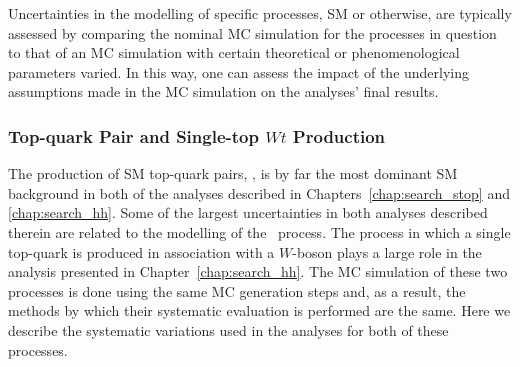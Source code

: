 Uncertainties in the modelling of specific processes, SM or otherwise, are typically
assessed by comparing the nominal MC simulation for the processes in question to
that of an MC simulation with certain theoretical or phenomenological parameters varied.
In this way, one can assess the impact of the underlying assumptions made
in the MC simulation on the analyses' final results.

\subsubsection{Top-quark Pair and Single-top $Wt$ Production}
The production of SM top-quark pairs, \ttbar, is by far the most dominant SM background
in both of the analyses described in Chapters~\ref{chap:search_stop} and \ref{chap:search_hh}.
Some of the largest uncertainties in both analyses described therein are related to the modelling
of the \ttbar~process.
The process in which a single top-quark is produced in association with a $W$-boson plays a large
role in the analysis presented in Chapter~\ref{chap:search_hh}.
The MC simulation of these two processes is done using the same MC generation steps and, as a result,
the methods by which their systematic evaluation is performed are the same.
Here we describe the systematic variations used in the analyses for both of these processes.

